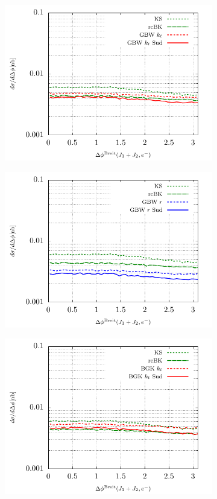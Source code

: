 \documentclass[11pt]{article}
\numberwithin{equation}{section}
\numberwithin{table}{section}
\numberwithin{figure}{section}
\begin{document}
\begin{figure}[p]
\begin{subfigure}{0.5\textwidth}
	\includegraphics[width=\textwidth]{plots/plotGBW2}
	\end{subfigure}
	\begin{subfigure}{0.5\textwidth}
	\includegraphics[width=\textwidth]{plots/plotGBW3}
	\end{subfigure}
	\begin{subfigure}{0.5\textwidth}
	\includegraphics[width=\textwidth]{plots/plotBGK2}

\end{subfigure}
\end{figure}
\end{document}

